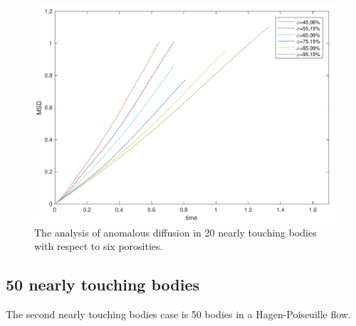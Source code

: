 \documentclass[preprint, 10pt]{elsarticle}
\begin{document}

\begin{figure}[H]
\center
\includegraphics*[width =0.5\linewidth]{./figs/anomalous_diffusion20d_new}
\caption{\label{fig:Eroding20anomalous} The analysis of anomalous diffusion in
 20 nearly touching bodies with respect to six porosities. }
\end{figure}
\subsection{50 nearly touching bodies}
{\color{red}
The second nearly touching bodies case is 50 bodies in a Hagen-Poiseuille flow.
}

\end{document}
